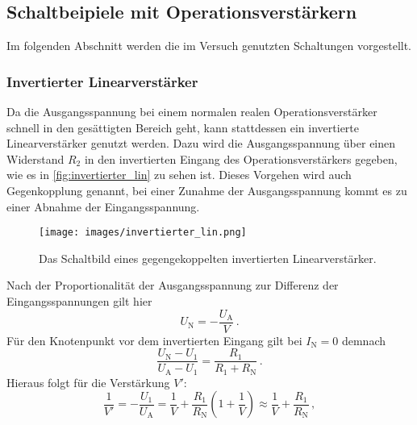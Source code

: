     \subsection{Schaltbeipiele mit Operationsverstärkern}

        \noindent 
        Im folgenden Abschnitt werden die im Versuch genutzten Schaltungen vorgestellt. 

        \subsubsection{Invertierter Linearverstärker}

            \noindent 
            Da die Ausgangsspannung bei einem normalen realen Operationsverstärker schnell in den gesättigten Bereich geht, kann stattdessen ein invertierte Linearverstärker 
            genutzt werden. 
            Dazu wird die Ausgangsspannung über einen Widerstand $R_2$ in den invertierten Eingang des Operationsverstärkers gegeben, wie es in \autoref{fig:invertierter_lin}
            zu sehen ist.
            Dieses Vorgehen wird auch Gegenkopplung genannt, bei einer Zunahme der Ausgangsspannung kommt es zu einer Abnahme der Eingangsspannung. 
            \begin{figure}[H]%
                \centering%
                \texttt{[image: images/invertierter\_lin.png]}%
                \caption{Das Schaltbild eines gegengekoppelten invertierten Linearverstärker. \cite{V51}}%
                \label{fig:invertierter_lin}%
            \end{figure}%
            Nach der Proportionalität der Ausgangsspannung zur Differenz der Eingangsspannungen gilt hier 
            \begin{equation}
                U_\text{N} = - \frac{U_\text{A}}{V}\, .
            \end{equation}
            Für den Knotenpunkt vor dem invertierten Eingang gilt bei $I_\text{N} = 0$ demnach 
            \begin{equation*}
                \frac{U_\text{N} - U_1}{U_\text{A} - U_1} = \frac{R_1}{R_1 + R_\text{N}}\, .
            \end{equation*}
            Hieraus folgt für die Verstärkung $V'$: 
            \begin{equation*}
                \frac{1}{V'} = - \frac{U_1}{U_\text{A}} = \frac{1}{V} + \frac{R_1}{R_\text{N}}\left(1 + \frac{1}{V}\right) \approx \frac{1}{V} + \frac{R_1}{R_\text{N}}\, ,
            \end{equation*}
